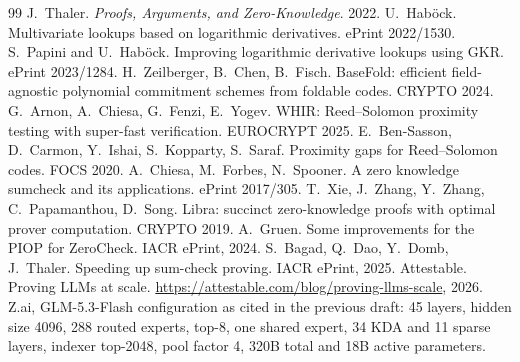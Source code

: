\documentclass[11pt]{article}
\begin{document}
\begin{thebibliography}{99}
 J.~Thaler. \emph{Proofs, Arguments, and Zero-Knowledge}. 2022.
 U.~Hab\"ock. Multivariate lookups based on logarithmic derivatives. ePrint 2022/1530.
 S.~Papini and U.~Hab\"ock. Improving logarithmic derivative lookups using GKR. ePrint 2023/1284.
 H.~Zeilberger, B.~Chen, B.~Fisch. BaseFold: efficient field-agnostic polynomial commitment schemes from foldable codes. CRYPTO 2024.
 G.~Arnon, A.~Chiesa, G.~Fenzi, E.~Yogev. WHIR: Reed--Solomon proximity testing with super-fast verification. EUROCRYPT 2025.
 E.~Ben-Sasson, D.~Carmon, Y.~Ishai, S.~Kopparty, S.~Saraf. Proximity gaps for Reed--Solomon codes. FOCS 2020.
 A.~Chiesa, M.~Forbes, N.~Spooner. A zero knowledge sumcheck and its applications. ePrint 2017/305.
 T.~Xie, J.~Zhang, Y.~Zhang, C.~Papamanthou, D.~Song. Libra: succinct zero-knowledge proofs with optimal prover computation. CRYPTO 2019.
 A.~Gruen. Some improvements for the PIOP for ZeroCheck. IACR ePrint, 2024.
 S.~Bagad, Q.~Dao, Y.~Domb, J.~Thaler. Speeding up sum-check proving. IACR ePrint, 2025.
 Attestable. Proving LLMs at scale. \url{https://attestable.com/blog/proving-llms-scale}, 2026.
 Z.ai, GLM-5.3-Flash configuration as cited in the previous draft: 45 layers, hidden size 4096, 288 routed experts, top-8, one shared expert, 34 KDA and 11 sparse layers, indexer top-2048, pool factor 4, 320B total and 18B active parameters.
\end{thebibliography}
\end{document}
